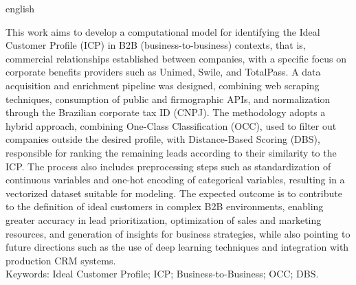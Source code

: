 \documentclass[
        oneside,      %
        english,			
        brazil			 
        ]{abntbibufjf}
\begin{document}
 
\begin{resumo}[ABSTRACT]
  \begin{otherlanguage*}{english}

  This work aims to develop a computational model for identifying the Ideal Customer Profile (ICP) in B2B (business-to-business) contexts, that is, commercial relationships established between companies, with a specific focus on corporate benefits providers such as Unimed, Swile, and TotalPass. A data acquisition and enrichment pipeline was designed, combining web scraping techniques, consumption of public and firmographic APIs, and normalization through the Brazilian corporate tax ID (CNPJ). The methodology adopts a hybrid approach, combining One-Class Classification (OCC), used to filter out companies outside the desired profile, with Distance-Based Scoring (DBS), responsible for ranking the remaining leads according to their similarity to the ICP. The process also includes preprocessing steps such as standardization of continuous variables and one-hot encoding of categorical variables, resulting in a vectorized dataset suitable for modeling. The expected outcome is to contribute to the definition of ideal customers in complex B2B environments, enabling greater accuracy in lead prioritization, optimization of sales and marketing resources, and generation of insights for business strategies, while also pointing to future directions such as the use of deep learning techniques and integration with production CRM systems. \\[18pt]

  Keywords: Ideal Customer Profile; ICP; Business-to-Business; OCC; DBS.

  \end{otherlanguage*}
\end{resumo}


\ilustvaria   %
\listilustvaria  %

\end{document}
